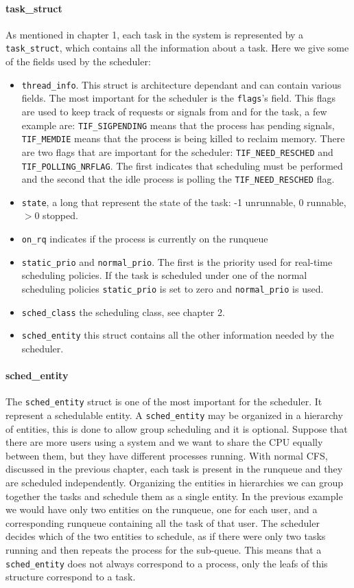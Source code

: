 \documentclass[10pt, oneside]{book}
\begin{document}
\paragraph{task\_struct}
As mentioned in chapter 1, each task in the system is represented by a \newline \verb|task_struct|, which contains all the information about a task. Here we give some of the fields used by the scheduler:
\begin{itemize}
    \item \verb|thread_info|. This struct is architecture dependant and can contain various fields. The most important for the scheduler is the \verb|flags|'s field. This flags are used to keep track of requests or signals from and for the task, a few example are: \verb|TIF_SIGPENDING| means that the process has pending signals, \verb|TIF_MEMDIE| means that the process is being killed to reclaim memory. There are two flags that are important for the scheduler: \verb|TIF_NEED_RESCHED| and \verb|TIF_POLLING_NRFLAG|. The first indicates that scheduling must be performed and the second that the idle process is polling the \verb|TIF_NEED_RESCHED| flag. %
    \item \verb|state|, a long that represent the state of the task: -1 unrunnable, 0 runnable, $>0$ stopped. 
    \item \verb|on_rq| indicates if the process is currently on the runqueue
    \item \verb|static_prio| and \verb|normal_prio|. The first is the priority used for real-time scheduling policies. If the task is scheduled under one of the normal scheduling policies \verb|static_prio| is set to zero and \verb|normal_prio| is used.
    \item \verb|sched_class| the scheduling class, see chapter 2.
    \item \verb|sched_entity| this struct contains all the other information needed by the scheduler.
\end{itemize}

\paragraph{sched\_entity}
The \verb|sched_entity| struct is one of the most important for the scheduler. It represent a schedulable entity.
A \verb|sched_entity| may be organized in a hierarchy of entities, this is done to allow group scheduling and it is optional. Suppose that there are more users using a system and we want to share the CPU equally between them, but they have different processes running. With normal CFS, discussed in the previous chapter, each task is present in the runqueue and they are scheduled independently. Organizing the entities in hierarchies we can group together the tasks and schedule them as a single entity. In the previous example we would have only two entities on the runqueue, one for each user, and a corresponding runqueue containing all the task of that user. The scheduler decides which of the two entities to schedule, as if there were only two tasks running and then repeats the process for the sub-queue. This means that a \verb|sched_entity| does not always correspond to a process, only the leafs of this structure correspond to a task. 
\end{document}
